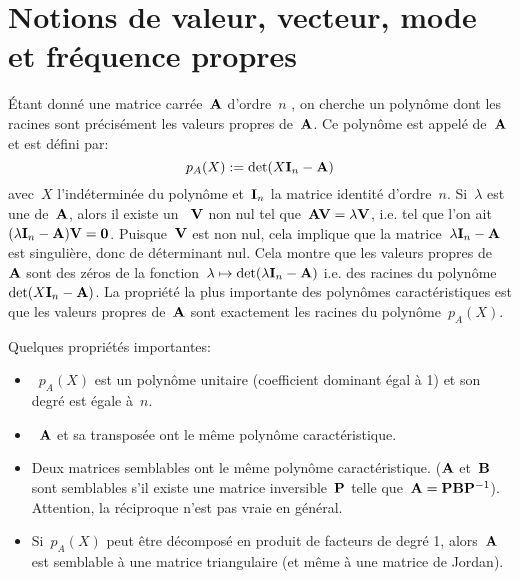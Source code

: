 \medskip
\section{Notions de valeur, vecteur, mode et fréquence propres}

\medskip
Étant donné une matrice carrée~$\MM{A}$ d'ordre~$n$ ,
on cherche un polynôme dont les racines sont précisément les valeurs propres de~$\MM{A}$.
Ce polynôme est appelé 
de~$\MM{A}$ et est défini par:
\begin{equation} p_A(X):=\det(X\MM{I}_n-\MM{A})\end{equation}
avec~$X$ l'indéterminée du polynôme et~$\MM{I}_n$ la matrice identité d'ordre~$n$.
\medskipvm
Si~$\lambda$ est une  de~$\MM{A}$, alors il existe un
~$\VV{V}$ non nul tel que~$\MM{A}\VV{V} = \lambda \VV{V}$, i.e.
tel que l'on ait~$(\lambda \MM{I}_n-\MM{A})\VV{V} = \VV{0}$.
\medskipvm
Puisque~$\VV{V}$ est non nul, cela implique que la matrice~$\lambda \MM{I}_n-\MM{A}$ est singulière, donc de déterminant nul.
\medskipvm
Cela montre que les valeurs propres de~$\MM{A}$ sont des zéros de la fonction~$\lambda\mapsto \det(\lambda \MM{I}_n - \MM{A})$
i.e. des racines du polynôme~$\det(X\MM{I}_n-\MM{A})$.
\medskipvm
La propriété la plus importante des polynômes caractéristiques est que
les valeurs propres de~$\MM{A}$ sont exactement les racines du polynôme~$p_A(X)$.

\medskip
Quelques propriétés importantes:
\begin{itemize}
  \item~$p_A(X)$ est un polynôme unitaire (coefficient dominant égal à 1) et son degré
	est égale à~$n$.
  \item~$\MM{A}$ et sa transposée ont le même polynôme caractéristique.
  \item Deux matrices semblables ont le même polynôme caractéristique. ($\MM{A}$ et~$\MM{B}$ sont semblables s'il
	existe une matrice inversible~$\MM{P}$ telle que~$\MM{A} = \MM{P}\MM{B}\MMI{P}$).
	Attention, la réciproque n'est pas vraie en général.
  \item Si~$p_A(X)$ peut être décomposé en produit de facteurs de degré 1, alors~$\MM{A}$ est semblable
	à une matrice triangulaire (et même à une matrice de Jordan).
\end{itemize}

